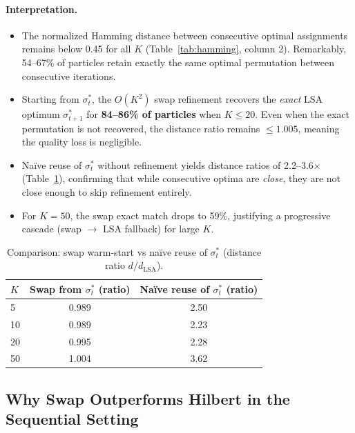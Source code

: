 \documentclass[11pt,a4paper]{article}
\begin{document}
\paragraph{Interpretation.}
\begin{itemize}
  \item The normalized Hamming distance between consecutive optimal assignments remains below 0.45 for all $K$ (Table~\ref{tab:hamming}, column 2). Remarkably, 54--67\% of particles retain exactly the same optimal permutation between consecutive iterations.

  \item Starting from $\sigma_t^*$, the $O(K^2)$ swap refinement recovers the \emph{exact} LSA optimum $\sigma_{t+1}^*$ for \textbf{84--86\% of particles} when $K \le 20$. Even when the exact permutation is not recovered, the distance ratio remains $\le 1.005$, meaning the quality loss is negligible.

  \item Na\"ive reuse of $\sigma_t^*$ without refinement yields distance ratios of 2.2--3.6$\times$ (Table~\ref{tab:hamming_reuse}), confirming that while consecutive optima are \emph{close}, they are not close enough to skip refinement entirely.

  \item For $K = 50$, the swap exact match drops to 59\%, justifying a progressive cascade (swap $\to$ LSA fallback) for large $K$.
\end{itemize}

\begin{table}[h!]
\centering
\caption{Comparison: swap warm-start vs na\"ive reuse of $\sigma_t^*$ (distance ratio $d/d_{\text{LSA}}$).}
\label{tab:hamming_reuse}
\begin{tabular}{l cc}
\toprule
$K$ & Swap from $\sigma_t^*$ (ratio) & Na\"ive reuse of $\sigma_t^*$ (ratio) \\
\midrule
5   & 0.989 & 2.50 \\
10  & 0.989 & 2.23 \\
20  & 0.995 & 2.28 \\
50  & 1.004 & 3.62 \\
\bottomrule
\end{tabular}
\end{table}


\subsection{Why Swap Outperforms Hilbert in the Sequential Setting}
\end{document}
